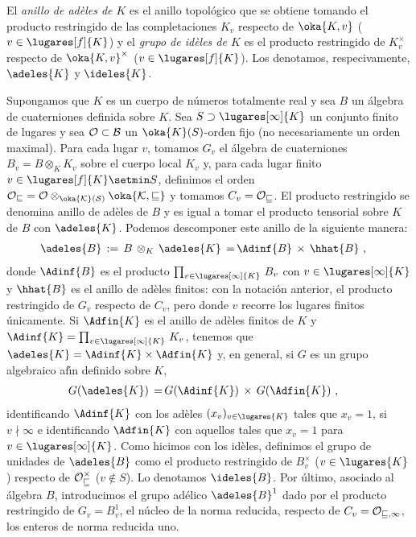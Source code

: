 El \emph{anillo de ad\`{e}les de $K$}
es el anillo topol\'{o}gico que se
obtiene tomando el producto restringido de las completaciones $K_{v}$
respecto de $\oka{K,v}$ ($v\in\lugares[f]{K}$) y el
\emph{grupo de id\`{e}les de $K$}
es el producto restringido de
$K_{v}^{\times}$ respecto de $\oka{K,v}^{\times}$ ($v\in\lugares[f]{K}$).
Los denotamos, respecivamente, $\adeles{K}$ y $\ideles{K}$.

%
Supongamos que $K$ es un cuerpo de n\'{u}meros totalmente real y sea $B$
un \'{a}lgebra de cuaterniones definida sobre $K$. Sea
$S\supset\lugares[\infty]{K}$ un conjunto finito de lugares y sea
$\cal{O}\subset B$ un $\oka{K}(S)$-orden fijo
(no necesariamente un orden maximal).
Para cada lugar $v$, tomamos $G_{v}$ el \'{a}lgebra de cuaterniones
$B_{v}=B\otimes_{K}K_{v}$ sobre el cuerpo local $K_{v}$ y, para cada lugar
finito $v\in\lugares[f]{K}\setmin S$, definimos el orden
$\cal{O}_{v}=\cal{O}\otimes_{\oka{K}(S)}\oka{K,v}$ y tomamos
$C_{v}=\cal{O}_{v}$. El producto restringido se denomina anillo de ad\`{e}les
de $B$ y es igual a tomar el producto tensorial sobre $K$ de $B$ con
$\adeles{K}$. Podemos descomponer este anillo de la siguiente manera:
\begin{align*}
 \adeles{B} \,:=\,B\,\otimes_{K}\,\adeles{K}\,=\, &
	\Adinf{B}\,\times\,\hhat{B}
	\text{ ,}
\end{align*}
%
donde $\Adinf{B}$ es el producto $\prod_{v\in\lugares[\infty]{K}}\,B_{v}$ con
$v\in\lugares[\infty]{K}$ y $\hhat{B}$ es el anillo de ad\`{e}les finitos:
con la notaci\'{o}n anterior, el producto restringido de $G_{v}$ respecto
de $C_{v}$, pero donde $v$ recorre los lugares finitos \'{u}nicamente.
Si $\Adfin{K}$ es el anillo de ad\`{e}les finitos de $K$ y
$\Adinf{K}=\prod_{v\in\lugares[\infty]{K}}\,K_{v}$, tenemos que
$\adeles{K}=\Adinf{K}\times\Adfin{K}$ y, en general, si
$G$ es un grupo algebraico af\'{\i}n definido sobre $K$,
\begin{align*}
	G(\adeles{K}) \,=\, & G(\Adinf{K})\,\times\,G(\Adfin{K})
	\text{ ,}
\end{align*}
%
identificando $\Adinf{K}$ con los ad\`{e}les $(x_{v})_{v\in\lugares{K}}$
tales que $x_{v}=1$, si $v\nmid\infty$ e identificando
$\Adfin{K}$ con aquellos tales que $x_{v}=1$ para $v\in\lugares[\infty]{K}$.
Como hicimos con los id\`{e}les, definimos el grupo de unidades de
$\adeles{B}$ como el producto restringido de $B_{v}^{\times}$
($v\in\lugares{K}$) respecto de $\cal{O}_{v}^{\times}$ ($v\not\in S$).
Lo denotamos $\ideles{B}$.
Por \'{u}ltimo, asociado al \'{a}lgebra $B$, introducimos el grupo
ad\'{e}lico $\adeles{B}^{1}$ dado por el producto restringido de
$G_{v}=B_{v}^{1}$, el n\'{u}cleo de la norma reducida, respecto de
$C_{v}=\cal{O}_{v,1}$, los enteros de norma reducida uno.

